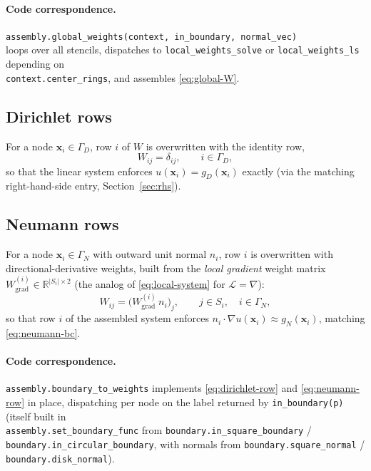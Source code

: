 \documentclass[11pt]{article}
\newcommand{\bx}{\mathbf{x}}
\newcommand{\R}{\mathbb{R}}
\newcommand{\grad}{\nabla}
\begin{document}
\paragraph{Code correspondence.}
\texttt{assembly.global\_weights(context, in\_boundary, normal\_vec)} \\
loops over all stencils, dispatches to
\texttt{local\_weights\_solve} or \texttt{local\_weights\_ls} depending
on \\ \texttt{context.center\_rings}, and assembles \eqref{eq:global-W}.

\subsection{Dirichlet rows}

For a node $\bx_i \in \Gamma_D$, row $i$ of $W$ is overwritten with the
identity row,
\begin{equation}
  W_{ij} = \delta_{ij}, \qquad i \in \Gamma_D,
  \label{eq:dirichlet-row}
\end{equation}
so that the linear system enforces $u(\bx_i) = g_D(\bx_i)$ exactly
(via the matching right-hand-side entry, Section~\ref{sec:rhs}).

\subsection{Neumann rows}
\label{sec:neumann}

For a node $\bx_i \in \Gamma_N$ with outward unit normal $n_i$, row $i$
is overwritten with directional-derivative weights, built from the
\emph{local gradient} weight matrix $W^{(i)}_{\text{grad}} \in
\R^{|S_i| \times 2}$ (the analog of \eqref{eq:local-system} for
$\mathcal{L} = \grad$):
\begin{equation}
  W_{ij} = \Big(W^{(i)}_{\text{grad}}\, n_i\Big)_{j}, \qquad j \in S_i,
  \quad i \in \Gamma_N,
  \label{eq:neumann-row}
\end{equation}
so that row $i$ of the assembled system enforces $n_i \cdot \grad u
(\bx_i) \approx g_N(\bx_i)$, matching \eqref{eq:neumann-bc}.

\paragraph{Code correspondence.}
\texttt{assembly.boundary\_to\_weights} implements \eqref{eq:dirichlet-row} and
\eqref{eq:neumann-row} in place, dispatching per node on the label
returned by \texttt{in\_boundary(p)} (itself built in \\
\texttt{assembly.set\_boundary\_func} from
\texttt{boundary.in\_square\_boundary} / \\
\texttt{boundary.in\_circular\_boundary}, with normals from
\texttt{boundary.square\_normal} / \\ \texttt{boundary.disk\_normal}).
\end{document}
